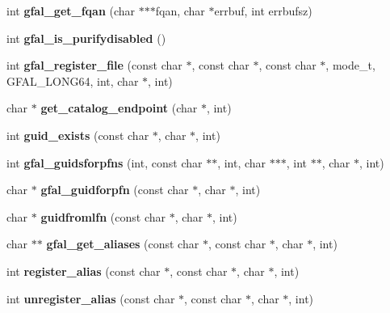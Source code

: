 \begin{CompactItemize}
\item 
int \textbf{gfal\_\-get\_\-fqan} (char $\ast$$\ast$$\ast$fqan, char $\ast$errbuf, int errbufsz)\label{group__internal__group_g54b4e29078838583c8022630ef5a2ed3}

\item 
int \textbf{gfal\_\-is\_\-purifydisabled} ()\label{group__internal__group_g3a35f0e6f616c5108f95cfffd557db77}

\item 
int \textbf{gfal\_\-register\_\-file} (const char $\ast$, const char $\ast$, const char $\ast$, mode\_\-t, GFAL\_\-LONG64, int, char $\ast$, int)\label{group__internal__group_gdb09f20d086253b45c5d2896be95b4a9}

\item 
char $\ast$ \textbf{get\_\-catalog\_\-endpoint} (char $\ast$, int)\label{gfal__common_8h_b3b834ff96e3d42df0404a02a9f8d1f5}

\item 
int \textbf{guid\_\-exists} (const char $\ast$, char $\ast$, int)\label{gfal__common_8h_7aea3a7b0803552b8f2a441f57d900a3}

\item 
int \textbf{gfal\_\-guidsforpfns} (int, const char $\ast$$\ast$, int, char $\ast$$\ast$$\ast$, int $\ast$$\ast$, char $\ast$, int)\label{group__internal__group_g72f2d9fb6a55816f243a4c57c5369fe5}

\item 
char $\ast$ \textbf{gfal\_\-guidforpfn} (const char $\ast$, char $\ast$, int)\label{group__internal__group_g86568afb8c7f9b0d6944de793a3e867a}

\item 
char $\ast$ \textbf{guidfromlfn} (const char $\ast$, char $\ast$, int)\label{gfal__common_8h_47c91fab6a02d32fcc1c6d6a53ba2ce3}

\item 
char $\ast$$\ast$ \textbf{gfal\_\-get\_\-aliases} (const char $\ast$, const char $\ast$, char $\ast$, int)\label{group__internal__group_g25d4ae6bef6570590efbc8548e7d79e2}

\item 
int \textbf{register\_\-alias} (const char $\ast$, const char $\ast$, char $\ast$, int)\label{gfal__common_8h_8a3be4d56dcedebe98cf84e8d5082782}

\item 
int \textbf{unregister\_\-alias} (const char $\ast$, const char $\ast$, char $\ast$, int)\label{gfal__common_8h_2483d66384257fdbe3b1fd6c568709b8}


\end{CompactItemize}
